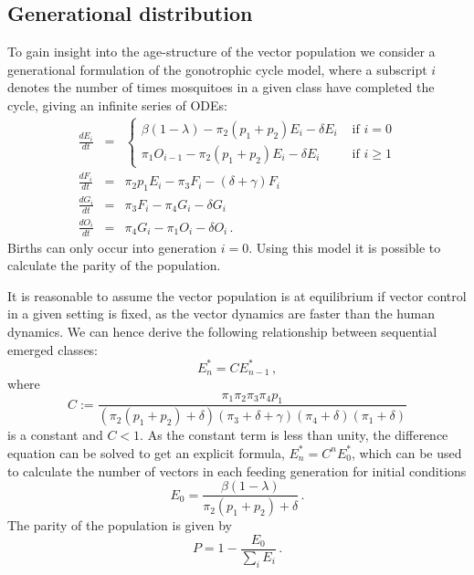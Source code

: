 \subsection{Generational distribution}

To gain insight into the age-structure of the vector population we consider a generational formulation of the gonotrophic cycle model, where a subscript $i$ denotes the number of times mosquitoes in a given class have completed the cycle, giving an infinite series of ODEs:
\begin{eqnarray}
\frac{dE_i}{dt} &=& \begin{cases}  \beta(1-\lambda) - \pi_2(p_1+p_2)E_{i} -\delta E_{i} &\mbox{ if } i=0\\ \pi_1O_{i-1} - \pi_2(p_1+p_2)E_{i} -\delta E_{i} &\mbox{ if } i\geq 1
\end{cases}\\
\frac{dF_i}{dt} &=& \pi_2p_1E_i - \pi_3 F_i - (\delta+\gamma) F_i \\
\frac{dG_i}{dt} &=& \pi_3F_i - \pi_4G_i - \delta G_i \\
\frac{dO_i}{dt} &=& \pi_4G_i - \pi_1O_i - \delta O_i \,.
\label{eqn:dist}
\end{eqnarray}
Births can only occur into generation $i=0$. Using this model it is possible to calculate the parity of the population.

It is reasonable to assume the vector population is at equilibrium if vector control in a given setting is fixed, as the vector dynamics are faster than the human dynamics. We can hence derive the following relationship between sequential emerged classes:
\begin{equation}
E_n^* = CE_{n-1}^*\,,
\end{equation}
where
\begin{equation}
C := \frac{\pi_1\pi_2\pi_3\pi_4p_1}{(\pi_2(p_1+p_2)+\delta)(\pi_3+\delta+\gamma)(\pi_4+\delta)(\pi_1+\delta)}
\end{equation}
is a constant and $C<1$. As the constant term is less than unity, the difference equation can be solved to get an explicit formula, $E_n^* = C^nE_0^*$, which can be used to calculate the number of vectors in each feeding generation for initial conditions
\begin{equation}
E_0 = \frac{\beta(1-\lambda)}{\pi_2(p_1+p_2)+\delta}\,.
\end{equation}
The parity of the population is given by
\begin{equation}
P = 1-\frac{E_0}{\sum_i E_i}\,.
\end{equation}

